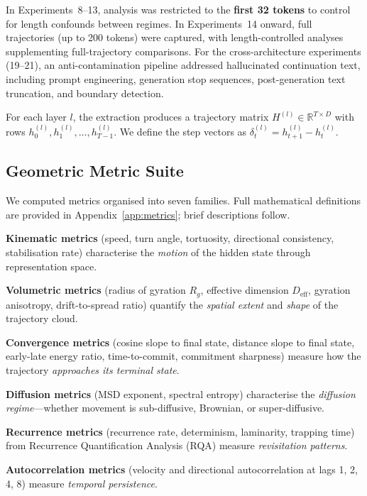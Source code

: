 \documentclass[11pt,twocolumn]{article}
\newcommand{\Rg}{R_g}
\newcommand{\Deff}{D_{\text{eff}}}
\begin{document}
In Experiments~8--13, analysis was restricted to the \textbf{first 32 tokens} to control for length confounds between regimes. In Experiments~14 onward, full trajectories (up to 200 tokens) were captured, with length-controlled analyses supplementing full-trajectory comparisons. For the cross-architecture experiments (19--21), an anti-contamination pipeline addressed hallucinated continuation text, including prompt engineering, generation stop sequences, post-generation text truncation, and boundary detection.

For each layer $l$, the extraction produces a trajectory matrix $H^{(l)} \in \mathbb{R}^{T \times D}$ with rows $h_0^{(l)}, h_1^{(l)}, \ldots, h_{T-1}^{(l)}$. We define the step vectors as $\delta_t^{(l)} = h_{t+1}^{(l)} - h_t^{(l)}$.

\subsection{Geometric Metric Suite}
\label{sec:metric_suite}

We computed metrics organised into seven families. Full mathematical definitions are provided in Appendix~\ref{app:metrics}; brief descriptions follow.

\textbf{Kinematic metrics} (speed, turn angle, tortuosity, directional consistency, stabilisation rate) characterise the \emph{motion} of the hidden state through representation space.

\textbf{Volumetric metrics} (radius of gyration $\Rg$, effective dimension $\Deff$, gyration anisotropy, drift-to-spread ratio) quantify the \emph{spatial extent} and \emph{shape} of the trajectory cloud.

\textbf{Convergence metrics} (cosine slope to final state, distance slope to final state, early-late energy ratio, time-to-commit, commitment sharpness) measure how the trajectory \emph{approaches its terminal state}.

\textbf{Diffusion metrics} (MSD exponent, spectral entropy) characterise the \emph{diffusion regime}---whether movement is sub-diffusive, Brownian, or super-diffusive.

\textbf{Recurrence metrics} (recurrence rate, determinism, laminarity, trapping time) from Recurrence Quantification Analysis (RQA) measure \emph{revisitation patterns}.

\textbf{Autocorrelation metrics} (velocity and directional autocorrelation at lags 1, 2, 4, 8) measure \emph{temporal persistence}.
\end{document}
